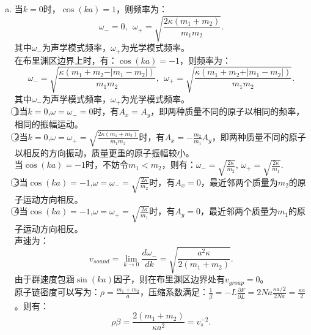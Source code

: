 \documentclass[reqno,a4paper,12pt]{amsart}
\begin{document}
\begin{tcolorbox}[breakable, colback = black!5!white, colframe = black]
\begin{enumerate}[(a)]
\item 当$k=0$时，$\cos(ka) = 1$，则频率为：
\[
	\omega_- = 0, ~~ \omega_+ = \sqrt{\frac{2\kappa(m_1+m_2)}{m_1m_2}}.
\]
其中$\omega_-$为声学模式频率，$\omega_+$为光学模式频率。 \\
在布里渊区边界上时，有：$\cos(ka) = -1$，则频率为：
\[
	\omega_- = \sqrt{\frac{\kappa(m_1+m_2-\vert m_1-m_2\vert)}{m_1m_2}}, ~~ \omega_+ = \sqrt{\frac{\kappa(m_1+m_2+\vert m_1-m_2\vert)}{m_1m_2}}.
\]
其中$\omega_-$为声学模式频率，$\omega_+$为光学模式频率。 \\
\textcircled{1}当$k=0$,$\omega = \omega_- = 0$时，有$A_x = A_y$，即两种质量不同的原子以相同的频率，相同的振幅运动。 \\
\textcircled{2}当$k=0$,$\omega = \omega_+ = \sqrt{\frac{2\kappa (m_1+m_2)}{m_1m_2}}$时，有$A_x = -\frac{m_2}{m_1}A_y$，即两种质量不同的原子以相反的方向振动，质量更重的原子振幅较小。\\
当$\cos(ka) = -1$时，不妨令$m_1<m_2$，则有：$\omega_- = \sqrt{\frac{2\kappa}{m_2}}$, $\omega_+ = \sqrt{\frac{2\kappa}{m_1}}$. \\
\textcircled{3}当$\cos(ka) = -1$,$\omega = \omega_- = \sqrt{\frac{2\kappa}{m_2}}$时，有$A_x = 0$，最近邻两个质量为$m_2$的原子运动方向相反。 \\
\textcircled{4}当$\cos(ka) = -1$,$\omega = \omega_+ = \sqrt{\frac{2\kappa}{m_1}}$时，有$A_y = 0$，最近邻两个质量为$m_1$的原子运动方向相反。 \\
声速为：
\[
	v_{sound} = \lim_{k\to 0}\frac{d\omega_-}{dk} = \sqrt{\frac{a^2\kappa}{2(m_1+m_2)}}.
\]
由于群速度包涵$\sin(ka)$因子，则在布里渊区边界处有$v_{group} = 0$。 \\
原子链密度可以写为：$\rho = \frac{m_1+m_2}{a}$，压缩系数满足：$\frac{1}{\beta} = -L\frac{\partial F}{\partial L} = 2Na \frac{\kappa a/2}{2Na} = \frac{\kappa a}{2}$。则有：
\[
	\rho\beta = \frac{2(m_1+m_2)}{\kappa a^2} = v_{s}^{-2}.
\]


\end{enumerate}
\end{tcolorbox}
\end{document}
